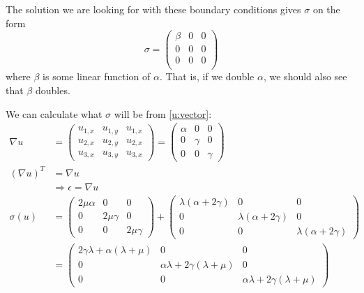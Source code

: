 \documentclass[twoside]{article}
\begin{document}
The solution we are looking for with these boundary conditions gives $\sigma$ on the form
\begin{equation}
\sigma = \left(\begin{matrix}
\beta & 0 & 0\\
0 & 0 & 0\\
0 & 0 & 0\\ 
\end{matrix}\right)
\label{sigma:stat}
\end{equation}
where $\beta$ is some linear function of $\alpha$. That is, if we double $\alpha$, we should also see that $\beta$ doubles.

We can calculate what $\sigma$ will be from \eqref{u:vector}:
\begin{align*}
\nabla u &= \left(\begin{matrix}
u_{1,x} & u_{1,y} & u_{1,x}\\
u_{2,x} & u_{2,y} & u_{2,x}\\
u_{3,x} & u_{3,y} & u_{3,x}
\end{matrix}\right)
=
\left(\begin{matrix}
\alpha & 0 & 0\\
0 &  \gamma & 0\\
0 & 0 &  \gamma
\end{matrix}\right)\\
(\nabla u)^T &= \nabla u\\
&\Rightarrow \epsilon = \nabla u\\
\sigma(u) &= 
\left(\begin{matrix}
2\mu\alpha & 0 & 0\\
0 &  2\mu\gamma & 0\\
0 & 0 &  2\mu\gamma
\end{matrix}\right)
+
\left(\begin{matrix}
\lambda(\alpha + 2\gamma) & 0 & 0\\
0 &  \lambda(\alpha + 2\gamma) & 0\\
0 & 0 &  \lambda(\alpha + 2\gamma)
\end{matrix}\right)\\
&=
\left(\begin{matrix}
2\gamma\lambda + \alpha(\lambda + \mu) & 0 & 0\\
0 &  \alpha\lambda + 2\gamma(\lambda + \mu) & 0\\
0 & 0 &  \alpha\lambda + 2\gamma(\lambda + \mu)
\end{matrix}\right)\\
\end{align*}
\end{document}
